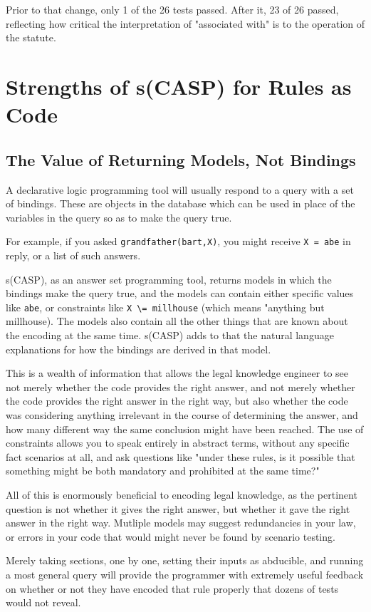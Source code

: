 \documentclass[sigconf]{acmart}
\begin{document}
Prior to that change, only 1 of the 26 tests passed. After it, 23 of 26 passed,
reflecting how critical the interpretation of "associated with" is to the operation
of the statute.

\section{Strengths of s(CASP) for Rules as Code}
\subsection{The Value of Returning Models, Not Bindings}
A declarative logic programming tool will usually respond to a query with a set of
bindings. These are objects in the database which can be used in place of the variables in the query so as to make the query true.

For example, if you asked \verb|grandfather(bart,X)|, you might receive \verb|X = abe| in reply, or a list of such answers.

s(CASP), as an answer set programming tool, returns models in which the bindings
make the query true, and the models can contain either specific values like
\verb|abe|, or constraints like \verb|X \= millhouse| (which means "anything but millhouse). The models also contain all
the other things that are known about the encoding at the same time. s(CASP) adds to that the natural language explanations for how the bindings are
derived in that model.

This is a wealth of information that allows the legal knowledge engineer to see not merely
whether the code provides the right answer, and not merely whether the code provides
the right answer in the right way, but also whether the code was considering anything
irrelevant in the course of determining the answer, and how many different way the same conclusion might have been reached. The use of constraints allows you to speak
entirely in abstract terms, without any specific fact scenarios at all, and ask
questions like "under these rules, is it possible that something might be both
mandatory and prohibited at the same time?"

All of this is enormously beneficial to encoding legal knowledge, as the pertinent
question is not whether it gives the right answer, but whether it gave the right
answer in the right way. Mutliple models may suggest redundancies in your law,
or errors in your code that would might never be found by scenario testing.

Merely taking sections, one by one, setting their inputs as abducible, and running
a most general query will provide the programmer with extremely useful feedback
on whether or not they have encoded that rule properly that dozens of tests would
not reveal.
\end{document}
